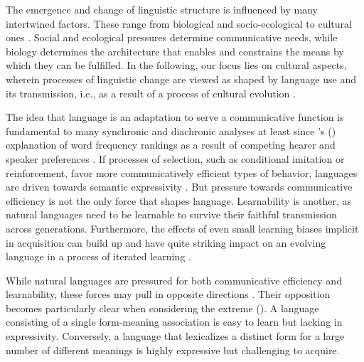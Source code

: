 \documentclass[a4paper, 11pt]{article}
\theoremstyle{Satz}
\newcommand{\citeposs}[2][]{\citeauthor{#2}'s (\citeyear[#1]{#2})}
\begin{document}
The emergence and change of linguistic structure is influenced by many intertwined
factors. These range from biological and socio-ecological to cultural ones \citep{benz+etal:2005b,steels:2011,tamariz+kirby:2016}. Social and ecological pressures determine communicative needs, while
biology determines the architecture that enables and constrains the means by which they can be
fulfilled. In the following, our focus lies on cultural aspects, wherein processes of
linguistic change are viewed as shaped by language use and its transmission, i.e., as a result
of a process of cultural evolution
\citep{Pagel2009:Human-Language-,ThompsonKirby2016:Culture-Shapes-}.

The idea that language is an adaptation to serve a communicative function is fundamental to
many synchronic and diachronic analyses at least since \citeposs{zipf:1949} explanation of word
frequency rankings as a result of competing hearer and speaker preferences \citep[e.g.,
in][]{martinet:1962, horn:1984,jaeger+vRooij:2007,jaeger:2007,
  piantadosi:2014,kirby+etal:2015}. If processes of selection, such as conditional imitation or
reinforcement, favor more communicatively efficient types of behavior, languages are driven
towards semantic expressivity \citep[e.g.,][]{nowak+krakauer:1999,Skyrms2010:Signals}. But
pressure towards communicative efficiency is not the only force that shapes
language. Learnability is another, as natural languages need to be learnable to survive their
faithful transmission across generations. Furthermore, the effects of even small learning biases implicit in acquisition can build up and have quite striking impact on an evolving language in a process of iterated
learning
\citep{KirbyHurford2002:The-Emergence-o,SmithKirby2003:Iterated-Learni,kirby+etal:2014}.

While natural languages are pressured for both communicative efficiency and learnability, these forces may
pull in opposite directions \citep[\S7]{christiansen+chater:2008}. Their opposition becomes particularly clear when considering the
extreme (\citealt{kemp+regier:2012,kirby+etal:2015}). A language consisting of a single
form-meaning association is easy to learn but lacking in expressivity. Conversely, a language
that lexicalizes a distinct form for a large number of different meanings is highly expressive
but challenging to acquire.
\end{document}
